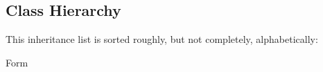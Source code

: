 \subsection{Class Hierarchy}
This inheritance list is sorted roughly, but not completely, alphabetically\-:\begin{DoxyCompactList}
\item Form\begin{DoxyCompactList}
\item {}
\end{DoxyCompactList}
\item {}
\end{DoxyCompactList}
